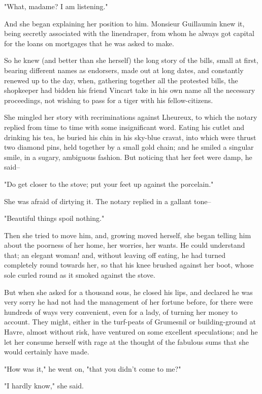 \documentclass{tufte-book}
\begin{document}
"What, madame? I am listening."

And she began explaining her position to him. Monsieur Guillaumin knew
it, being secretly associated with the linendraper, from whom he always
got capital for the loans on mortgages that he was asked to make.

So he knew (and better than she herself) the long story of the bills,
small at first, bearing different names as endorsers, made out at long
dates, and constantly renewed up to the day, when, gathering together
all the protested bills, the shopkeeper had bidden his friend Vincart
take in his own name all the necessary proceedings, not wishing to pass
for a tiger with his fellow-citizens.

She mingled her story with recriminations against Lheureux, to which the
notary replied from time to time with some insignificant word. Eating
his cutlet and drinking his tea, he buried his chin in his sky-blue
cravat, into which were thrust two diamond pins, held together by a
small gold chain; and he smiled a singular smile, in a sugary, ambiguous
fashion. But noticing that her feet were damp, he said--

"Do get closer to the stove; put your feet up against the porcelain."

She was afraid of dirtying it. The notary replied in a gallant tone--

"Beautiful things spoil nothing."

Then she tried to move him, and, growing moved herself, she began
telling him about the poorness of her home, her worries, her wants.
He could understand that; an elegant woman! and, without leaving off
eating, he had turned completely round towards her, so that his knee
brushed against her boot, whose sole curled round as it smoked against
the stove.

But when she asked for a thousand sous, he closed his lips, and declared
he was very sorry he had not had the management of her fortune before,
for there were hundreds of ways very convenient, even for a lady, of
turning her money to account. They might, either in the turf-peats
of Grumesnil or building-ground at Havre, almost without risk, have
ventured on some excellent speculations; and he let her consume herself
with rage at the thought of the fabulous sums that she would certainly
have made.

"How was it," he went on, "that you didn't come to me?"

"I hardly know," she said.
\end{document}

